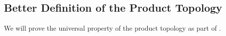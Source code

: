 \subsection{Better Definition of the Product Topology}

We will prove the universal property of the product topology as part of .
